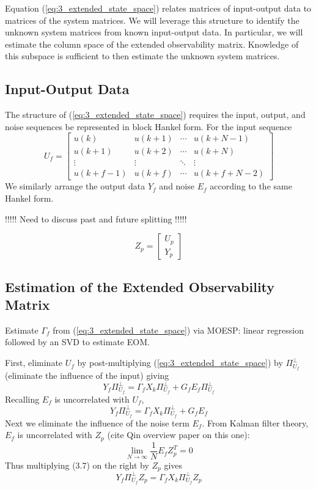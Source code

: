 Equation (\ref{eq:3_extended_state_space}) relates matrices of input-output data to matrices of the system matrices. We will leverage this structure to identify the unknown system matrices from known input-output data. In particular, we will estimate the column space of the extended observability matrix. Knowledge of this subspace is sufficient to then estimate the unknown system matrices. 

\subsection{Input-Output Data}
The structure of (\ref{eq:3_extended_state_space}) requires the input, output, and noise sequences be represented in block Hankel form. For the input sequence
\begin{equation}\label{eq:3_input}
U_f = \begin{bmatrix}
u(k) & u(k+1) & \cdots & u(k+N-1)\\
u(k+1) & u(k+2) & \cdots & u(k+N)\\
\vdots & \vdots & \ddots & \vdots\\
u(k+f-1) & u(k+f) & \cdots & u(k+f+N-2)
\end{bmatrix}
\end{equation}
We similarly arrange the output data $Y_f$ and noise $E_f$ according to the same Hankel form.

!!!!! Need to discuss past and future splitting !!!!!

\begin{equation*}
Z_p = \begin{bmatrix} U_p\\ Y_p\end{bmatrix}
\end{equation*}

\subsection{Estimation of the Extended Observability Matrix}
Estimate $\Gamma_f$ from (\ref{eq:3_extended_state_space}) via MOESP: linear regression followed by an SVD to estimate EOM.

First, eliminate $U_f$ by post-multiplying (\ref{eq:3_extended_state_space}) by $\Pi_{U_f}^\perp$ (eliminate the influence of the input) giving
\begin{equation}
Y_f\Pi_{U_f}^\perp = \Gamma_f X_k\Pi_{U_f}^\perp + G_f E_f\Pi_{U_f}^\perp
\end{equation}
Recalling $E_f$ is uncorrelated with $U_f$, 
\begin{equation}
Y_f\Pi_{U_f}^\perp = \Gamma_f X_k\Pi_{U_f}^\perp + G_f E_f
\end{equation}
Next we eliminate the influence of the noise term $E_f$. From Kalman filter theory, $E_f$ is uncorrelated with $Z_p$ (cite Qin overview paper on this one):
\begin{equation*}
\lim_{N\rightarrow\infty}\frac{1}{N}E_fZ_p^T =0
\end{equation*}
Thus multiplying (3.7) on the right by $Z_p$ gives
\begin{equation}
Y_f\Pi_{U_f}^\perp Z_p = \Gamma_f X_k\Pi_{U_f}^\perp Z_p
\end{equation}


